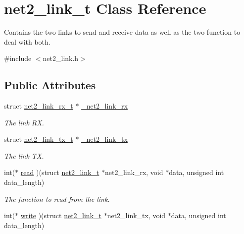 \hypertarget{structnet2__link__t}{\section{net2\-\_\-link\-\_\-t Class Reference}
\label{structnet2__link__t}
}


Contains the two links to send and receive data as well as the two function to deal with both.  




{\ttfamily \#include $<$net2\-\_\-link.\-h$>$}

\subsection*{Public Attributes}
\begin{DoxyCompactItemize}
\item 
\hypertarget{structnet2__link__t_ade9ac4a9cf97e38b5fae6e6279a4c6ff}{struct \hyperlink{structnet2__link__rx__t}{net2\-\_\-link\-\_\-rx\-\_\-t} $\ast$ \hyperlink{structnet2__link__t_ade9ac4a9cf97e38b5fae6e6279a4c6ff}{\-\_\-net2\-\_\-link\-\_\-rx}}\label{structnet2__link__t_ade9ac4a9cf97e38b5fae6e6279a4c6ff}

\begin{DoxyCompactList}\small\item\em The link R\-X. \end{DoxyCompactList}\item 
\hypertarget{structnet2__link__t_a5a327b2bafa4b1bc084cb26f3a3955bd}{struct \hyperlink{structnet2__link__tx__t}{net2\-\_\-link\-\_\-tx\-\_\-t} $\ast$ \hyperlink{structnet2__link__t_a5a327b2bafa4b1bc084cb26f3a3955bd}{\-\_\-net2\-\_\-link\-\_\-tx}}\label{structnet2__link__t_a5a327b2bafa4b1bc084cb26f3a3955bd}

\begin{DoxyCompactList}\small\item\em The link T\-X. \end{DoxyCompactList}\item 
\hypertarget{structnet2__link__t_a4a95768a698152d1be5dc2b416581a49}{int($\ast$ \hyperlink{structnet2__link__t_a4a95768a698152d1be5dc2b416581a49}{read} )(struct \hyperlink{structnet2__link__t}{net2\-\_\-link\-\_\-t} $\ast$net2\-\_\-link\-\_\-rx, void $\ast$data, unsigned int data\-\_\-length)}\label{structnet2__link__t_a4a95768a698152d1be5dc2b416581a49}

\begin{DoxyCompactList}\small\item\em The function to read from the link. \end{DoxyCompactList}\item 
\hypertarget{structnet2__link__t_ac1513cd0177b78d51e564224be84ef01}{int($\ast$ \hyperlink{structnet2__link__t_ac1513cd0177b78d51e564224be84ef01}{write} )(struct \hyperlink{structnet2__link__t}{net2\-\_\-link\-\_\-t} $\ast$net2\-\_\-link\-\_\-tx, void $\ast$data, unsigned int data\-\_\-length)}\label{structnet2__link__t_ac1513cd0177b78d51e564224be84ef01}


\end{DoxyCompactItemize}
